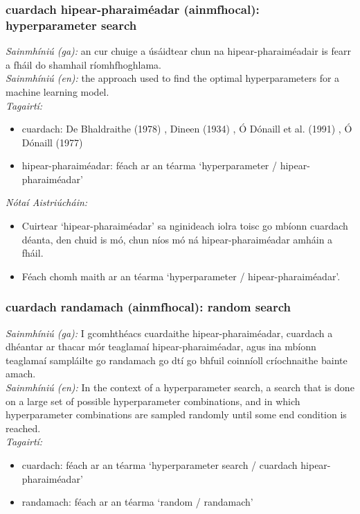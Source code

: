 \subsubsection*{cuardach hipear-pharaiméadar (ainmfhocal): hyperparameter search}
 \noindent \textit{Sainmhíniú (ga):} an cur chuige a úsáidtear chun na hipear-pharaiméadair is fearr a fháil do shamhail ríomhfhoghlama.
\\
 \noindent \textit{Sainmhíniú (en):} the approach used to find the optimal hyperparameters for a machine learning model.
\\
 \noindent \textit{Tagairtí:}
\begin{itemize}
	\item cuardach: De Bhaldraithe (1978) \cite{de-bhaldraithe}, Dineen (1934) \cite{dineen}, Ó Dónaill et al. (1991) \cite{focloir-beag}, Ó Dónaill (1977) \cite{odonaill}
	\item hipear-pharaiméadar: féach ar an téarma `hyperparameter / hipear-pharaiméadar'
\end{itemize}

 \noindent \textit{Nótaí Aistriúcháin:}
\begin{itemize}
	\item Cuirtear `hipear-pharaiméadar' sa nginideach iolra toisc go mbíonn cuardach déanta, den chuid is mó, chun níos mó ná hipear-pharaiméadar amháin a fháil.
	\item Féach chomh maith ar an téarma `hyperparameter / hipear-pharaiméadar'.
\end{itemize}


\subsubsection*{cuardach randamach (ainmfhocal): random search}
 \noindent \textit{Sainmhíniú (ga):} I gcomhthéacs cuardaithe hipear-pharaiméadar, cuardach a dhéantar ar thacar mór teaglamaí hipear-pharaiméadar, agus ina mbíonn teaglamaí sampláilte go randamach go dtí go bhfuil coinníoll críochnaithe bainte amach.
\\
 \noindent \textit{Sainmhíniú (en):} In the context of a hyperparameter search, a search that is done on a large set of possible hyperparameter combinations, and in which hyperparameter combinations are sampled randomly until some end condition is reached.
\\
 \noindent \textit{Tagairtí:}
\begin{itemize}
	\item cuardach: féach ar an téarma `hyperparameter search / cuardach hipear-pharaiméadar'
	\item randamach: féach ar an téarma `random / randamach'
\end{itemize}

